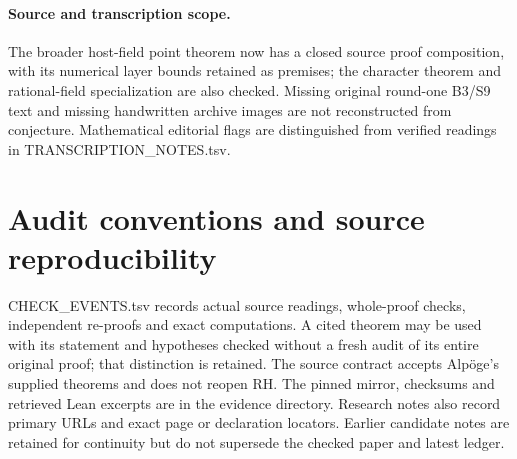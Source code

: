 \documentclass[11pt,a4paper]{article}
\theoremstyle{definition}
\begin{document}
\paragraph{Source and transcription scope.}
The broader host-field point theorem now has a closed source proof
composition, with its numerical layer bounds retained as premises;
the character theorem and rational-field specialization are also checked. Missing original
round-one B3/S9 text and missing handwritten archive images are not
reconstructed from conjecture. Mathematical editorial flags are
distinguished from verified readings in TRANSCRIPTION\_NOTES.tsv.

\section{Audit conventions and source reproducibility}
CHECK\_EVENTS.tsv records actual source readings, whole-proof checks,
independent re-proofs and exact computations. A cited theorem may be
used with its statement and hypotheses checked without a fresh audit of
its entire original proof; that distinction is retained. The source
contract accepts Alp\"oge's supplied theorems and does not reopen RH.
The pinned mirror, checksums and retrieved Lean excerpts are in the
evidence directory. Research notes also record primary URLs and exact
page or declaration locators. Earlier candidate notes are retained for
continuity but do not supersede the checked paper and latest ledger.
\end{document}
